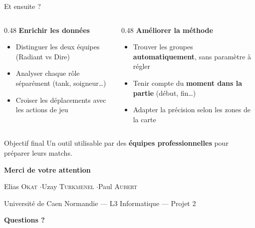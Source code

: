 \documentclass[aspectratio=169, 11pt]{beamer}
\begin{document}
\begin{frame}{Et ensuite ?}

\centering
\vspace{0.3cm}

\begin{columns}[T]
\begin{column}{0.48\textwidth}
    \centering
    \textcolor{dota_accent}{\textbf{Enrichir les données}}
    \begin{itemize}\setlength{\itemsep}{10pt}
        \item Distinguer les deux équipes (Radiant vs Dire)
        \item Analyser chaque rôle séparément (tank, soigneur\ldots)
        \item Croiser les déplacements avec les actions de jeu
    \end{itemize}
\end{column}
\begin{column}{0.48\textwidth}
    \centering
    \textcolor{dota_blue}{\textbf{Améliorer la méthode}}
    \begin{itemize}\setlength{\itemsep}{10pt}
        \item Trouver les groupes \textbf{automatiquement}, sans paramètre à régler
        \item Tenir compte du \textbf{moment dans la partie} (début, fin\ldots)
        \item Adapter la précision selon les zones de la carte
    \end{itemize}
\end{column}
\end{columns}

\vspace{0.5cm}
\begin{exampleblock}{Objectif final}
\centering
Un outil utilisable par des \textbf{équipes professionnelles} pour préparer leurs matchs.
\end{exampleblock}

\end{frame}

\begin{frame}[plain]
\centering
\vspace{1.5cm}

{\Huge\textbf{\textcolor{dota_accent}{Merci de votre attention}}}

\vspace{0.8cm}

{\large Elias \textsc{Okat} \quad$\cdot$\quad Uzay \textsc{Turkmenel} \quad$\cdot$\quad Paul \textsc{Aubert}}

\vspace{0.4cm}

{\small Université de Caen Normandie --- L3 Informatique --- Projet 2}

\vspace{1cm}

{\normalsize\textcolor{dota_blue}{\textbf{Questions ?}}}

\end{frame}
\end{document}
